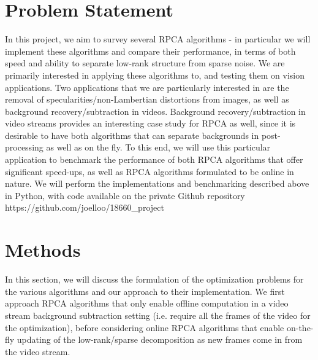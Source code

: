 \documentclass[oneside]{article}
\begin{document}
\section{Problem Statement}
In this project, we aim to survey several RPCA algorithms - in particular we will implement these algorithms and compare their performance, in terms of both speed and ability to separate low-rank structure from sparse noise. We are primarily interested in applying these algorithms to, and testing them on vision applications. Two applications that we are particularly interested in are the removal of specularities/non-Lambertian distortions from images, as well as background recovery/subtraction in videos. Background recovery/subtraction in video streams provides an interesting case study for RPCA as well, since it is desirable to have both algorithms that can separate backgrounds in post-processing as well as on the fly. To this end, we will use this particular application to benchmark the performance of both RPCA algorithms that offer significant speed-ups, as well as RPCA algorithms formulated to be online in nature. We will perform the implementations and benchmarking described above in Python, with code available on the private Github repository https://github.com/joelloo/18660\_project
\section{Methods}
In this section, we will discuss the formulation of the optimization problems for the various algorithms and  our approach to their implementation. We first approach RPCA algorithms that only enable offline computation in a video stream background subtraction setting (i.e. require all the frames of the video for the optimization), before considering online RPCA algorithms that enable on-the-fly updating of the low-rank/sparse decomposition as new frames come in from the video stream.
\end{document}
